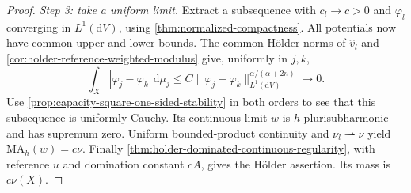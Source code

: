 \begin{proof}
\emph{Step 3: take a uniform limit.} Extract a subsequence with $c_l\to c>0$ and $\varphi_l$ converging in $L^1(\mathrm dV)$, using \cref{thm:normalized-compactness}. All potentials now have common upper and lower bounds. The common H\"older norms of $\widehat v_l$ and \cref{cor:holder-reference-weighted-modulus} give, uniformly in $j,k$,
\[
 \int_X|\varphi_j-\varphi_k|\,\mathrm d\mu_j
 \leq C\|\varphi_j-\varphi_k\|_{L^1(\mathrm dV)}^{\alpha/(\alpha+2n)}
 \longrightarrow0.
\]
Use \cref{prop:capacity-square-one-sided-stability} in both orders to see that this subsequence is uniformly Cauchy. Its continuous limit $w$ is $h$-plurisubharmonic and has supremum zero. Uniform bounded-product continuity and $\nu_l\rightharpoonup\nu$ yield $\mathrm{MA}_h(w)=c\nu$. Finally \cref{thm:holder-dominated-continuous-regularity}, with reference $u$ and domination constant $cA$, gives the H\"older assertion. Its mass is $c\nu(X)$.
\end{proof}
